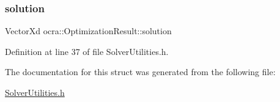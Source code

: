 \hypertarget{structocra_1_1OptimizationResult_a5d0f76e8b3e5d517ba83a2ecd082f85b}{}\label{structocra_1_1OptimizationResult_a5d0f76e8b3e5d517ba83a2ecd082f85b} 
\subsubsection{\texorpdfstring{solution}{solution}}
{\footnotesize\ttfamily Vector\+Xd ocra\+::\+Optimization\+Result\+::solution}



Definition at line 37 of file Solver\+Utilities.\+h.



The documentation for this struct was generated from the following file\+:\begin{DoxyCompactItemize}
\item 
\hyperlink{SolverUtilities_8h}{Solver\+Utilities.\+h}\end{DoxyCompactItemize}
